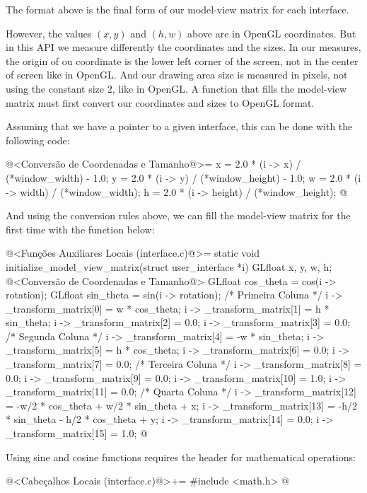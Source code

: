 The format above is the final form of our model-view matrix for each
interface.

However, the values $(x, y)$ and $(h, w)$ above are in OpenGL
coordinates. But in this API we measure differently the coordinates
and the sizes. In our measures, the origin of ou coordinate is the
lower left corner of the screen, not in the center of screen like in
OpenGL. And our drawing area size is measured in pixels, not using the
constant size 2, like in OpenGL. A function that fills the model-view
matrix must first convert our coordinates and sizes to OpenGL format.

Assuming that we have a pointer  to a given interface,
this can be done with the following code:

\iniciocodigo
@<Conversão de Coordenadas e Tamanho@>=
x = 2.0 * (i -> x) / (*window_width) - 1.0;
y = 2.0 * (i -> y) / (*window_height) - 1.0;
w = 2.0 * (i -> width) / (*window_width);
h = 2.0 * (i -> height) / (*window_height);
@
\fimcodigo

And using the conversion rules above, we can fill the model-view
matrix for the first time with the function below:

\iniciocodigo
@<Funções Auxiliares Locais (interface.c)@>=
static void initialize_model_view_matrix(struct user_interface *i){
  GLfloat x, y, w, h;
  @<Conversão de Coordenadas e Tamanho@>
  GLfloat cos_theta = cos(i -> rotation);
  GLfloat sin_theta = sin(i -> rotation);
  /* Primeira Coluna */
  i -> _transform_matrix[0] = w * cos_theta;
  i -> _transform_matrix[1] = h * sin_theta;
  i -> _transform_matrix[2] = 0.0;
  i -> _transform_matrix[3] = 0.0;
  /* Segunda Coluna */
  i -> _transform_matrix[4] = -w * sin_theta;
  i -> _transform_matrix[5] = h * cos_theta;
  i -> _transform_matrix[6] = 0.0;
  i -> _transform_matrix[7] = 0.0;
  /* Terceira Coluna */
  i -> _transform_matrix[8] = 0.0;
  i -> _transform_matrix[9] = 0.0;
  i -> _transform_matrix[10] = 1.0;
  i -> _transform_matrix[11] = 0.0;
  /* Quarta Coluna */
  i -> _transform_matrix[12] = -w/2 * cos_theta + w/2 * sin_theta + x;
  i -> _transform_matrix[13] = -h/2 * sin_theta - h/2 * cos_theta + y;
  i -> _transform_matrix[14] = 0.0;
  i -> _transform_matrix[15] = 1.0;
}
@
\fimcodigo

Using sine and cosine functions requires the header for mathematical
operations:

\iniciocodigo
@<Cabeçalhos Locais (interface.c)@>+=
#include <math.h>
@
\fimcodigo


